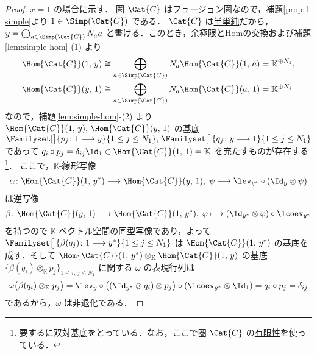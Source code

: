 \documentclass[TQFT_main]{subfiles}
\begin{document}
\begin{proof}
    $x = 1$ の場合に示す．
    圏 $\Cat{C}$ は\hyperref[def:tensorfusion-cat]{フュージョン圏}なので，補題\ref{prop:1-simple}より $1 \in \Simp(\Cat{C})$ である．
    $\Cat{C}$ は\hyperref[def:semisimple-cat]{半単純}だから，$y = \bigoplus_{a \in \Simp(\Cat{C})} N_a a$ と書ける．このとき，\hyperref[prop:lim-colim-basic]{余極限とHomの交換}および補題\ref{lem:simple-hom}-(1) より
    \begin{align}
        \Hom{\Cat{C}}(1,\, y) &\cong \bigoplus_{a \in \Simp(\Cat{C})} N_a \Hom{\Cat{C}}(1,\, a) = \mathbb{K}^{\oplus N_1}, \\
        \Hom{\Cat{C}}(y,\, 1) &\cong \bigoplus_{a \in \Simp(\Cat{C})} N_a \Hom{\Cat{C}}(a,\, 1) = \mathbb{K}^{\oplus N_1}
    \end{align}
    なので，補題\ref{lem:simple-hom}-(2) より $\Hom{\Cat{C}}(1,\, y),\, \Hom{\Cat{C}}(y,\, 1)$ の基底 $\Familyset[\big]{p_j \colon 1 \lto y}{1 \le j \le N_1},\, \Familyset[\big]{q_j \colon y \lto 1}{1 \le j \le N_1}$ であって $q_i \circ p_j = \delta_{ij} \Id_1 \in \Hom{\Cat{C}}(1,\, 1) = \mathbb{K}$ を充たすものが存在する\footnote{要するに双対基底をとっている．なお，ここで圏 $\Cat{C}$ の\hyperref[def:finite-abcat]{有限性}を使っている．}．
    ここで，$\mathbb{K}$-線形写像
    \begin{align}
        \alpha \colon \Hom{\Cat{C}}(1,\, y^*) \lto \Hom{\Cat{C}}(y,\, 1),\; \psi \lmto \lev_{y^*} \circ (\Id_y \otimes \psi)
    \end{align}
    は逆写像
    \begin{align}
        \beta \colon \Hom{\Cat{C}}(y,\, 1) \lto \Hom{\Cat{C}}(1,\, y^*),\; \varphi \lmto (\Id_{y^*} \otimes \varphi) \circ \lcoev_{y^*}
    \end{align}
    を持つので $\mathbb{K}$-ベクトル空間の同型写像であり，よって $\Familyset[\big]{\beta(q_j) \colon 1 \lto y^* }{1 \le j \le N_1}$ は $\Hom{\Cat{C}}(1,\, y^*)$ の基底を成す．そして
    $\Hom{\Cat{C}}(1,\, y^*) \otimes_{\mathbb{K}} \Hom{\Cat{C}}(1,\, y)$ の基底 $\{\beta(q_i) \otimes_{\mathbb{K}} p_j\}_{1 \le i,\, j \le N_1}$ に関する $\omega$ の表現行列は
    \begin{align}
        \omega\bigl(\beta(q_i) \otimes_{\mathbb{K}} p_j\bigr) = \lev_{y} \circ \bigl((\Id_{y^*} \otimes q_i) \otimes p_j\bigr) \circ (\lcoev_{y^*} \otimes \Id_1) = q_i \circ p_j = \delta_{ij}
    \end{align}
    であるから，$\omega$ は非退化である．
\end{proof}
\end{document}
